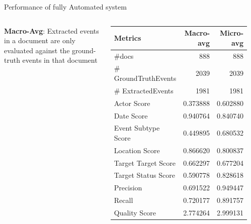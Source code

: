 \begin{frame}{Performance of fully Automated system}
\begin{columns}
\textbf{Macro-Avg}: Extracted events in a document are only evaluated against the ground-truth events in that document
        \begin{table}
    \centering
    \begin{tabular}{l|r|r}
    \toprule
                 Metrics &    Macro-avg &    Micro-avg \\
    \midrule
                   \#docs &   888 &   888 \\
     \# GroundTruthEvents &  2039 &  2039 \\
       \# ExtractedEvents &  1981 &  1981 \\
             Actor Score &     0.373888 &     0.602880 \\
              Date Score &     0.940764 &     0.840740 \\
     Event Subtype Score &     0.449895 &     0.680532 \\
          Location Score &     0.866620 &     0.800837 \\
     Target Target Score &     0.662297 &     0.677204 \\
     Target Status Score &     0.590778 &     0.828618 \\
               Precision &     0.691522 &     0.949447 \\
                  Recall &     0.720177 &     0.891757 \\
           Quality Score &     2.774264 &     2.999131 \\
    \bottomrule
    \end{tabular}
    \label{tab:mlPerformance}
    \end{table}
\end{columns}
\end{frame}

